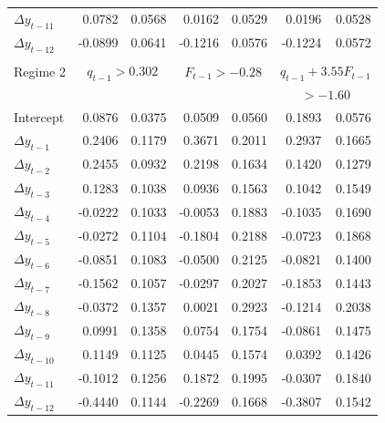 \documentclass[12pt, reqno]{amsart}
\begin{document}
\begin{table}[htp]
\begin{center}
\begin{tabular}{lrrrrrr}
$\Delta y_{t-11}$ &   0.0782   &  0.0568 &  0.0162  &  0.0529 &    0.0196   &   0.0528   \\
$\Delta y_{t-12}$ &  -0.0899   &  0.0641 & -0.1216  &  0.0576 &   -0.1224   &   0.0572   \\
\hline
\\
Regime 2          & \multicolumn{2}{c}{$q_{t-1} > 0.302$} & \multicolumn{2}{c}{$F_{t-1} > -0.28$} & \multicolumn{2}{c}{$q_{t-1} + 3.55 F_{t-1}$} \\
        &  & & & & \multicolumn{2}{c}{$> -1.60$} \vspace*{1ex} \\
%
Intercept         &   0.0876   &  0.0375  &  0.0509  &  0.0560  &    0.1893   &    0.0576   \\
$\Delta y_{t-1}$  &   0.2406   &  0.1179  &  0.3671  &  0.2011  &    0.2937   &    0.1665   \\
$\Delta y_{t-2}$  &   0.2455   &  0.0932  &  0.2198  &  0.1634  &    0.1420   &    0.1279   \\
$\Delta y_{t-3}$  &   0.1283   &  0.1038  &  0.0936  &  0.1563  &    0.1042   &    0.1549   \\
$\Delta y_{t-4}$  &  -0.0222   &  0.1033  & -0.0053  &  0.1883  &   -0.1035   &    0.1690   \\
$\Delta y_{t-5}$  &  -0.0272   &  0.1104  & -0.1804  &  0.2188  &   -0.0723   &    0.1868   \\
$\Delta y_{t-6}$  &  -0.0851   &  0.1083  & -0.0500  &  0.2125  &   -0.0821   &    0.1400   \\
$\Delta y_{t-7}$  &  -0.1562   &  0.1057  & -0.0297  &  0.2027  &   -0.1853   &    0.1443   \\
$\Delta y_{t-8}$  &  -0.0372   &  0.1357  &  0.0021  &  0.2923  &   -0.1214   &    0.2038   \\
$\Delta y_{t-9}$  &   0.0991   &  0.1358  &  0.0754  &  0.1754  &   -0.0861   &    0.1475   \\
$\Delta y_{t-10}$ &   0.1149   &  0.1125  &  0.0445  &  0.1574  &    0.0392   &    0.1426   \\
$\Delta y_{t-11}$ &  -0.1012   &  0.1256  &  0.1872  &  0.1995  &   -0.0307   &    0.1840   \\
$\Delta y_{t-12}$ &  -0.4440   &  0.1144  & -0.2269  &  0.1668  &   -0.3807   &    0.1542   \\

\end{tabular}
\end{center}
\end{table}
\end{document}
